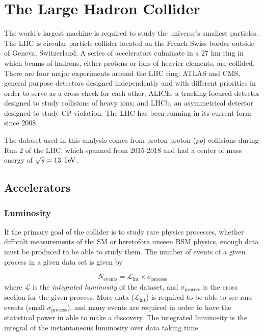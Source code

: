 \chapter{The Large Hadron Collider}

The world's largest machine is required to study the universe's smallest particles. The \ac{LHC} is circular particle collider located on the French-Swiss border outside of Geneva, Switzerland. A series of accelerators culminate in a $27$ km ring in which beams of hadrons, either protons or ions of heavier elements, are collided. There are four major experiments around the \ac{LHC} ring: \ac{ATLAS} and \ac{CMS}, general purpose detectors designed independently and with different priorities in order to serve as a cross-check for each other; \ac{ALICE}, a tracking-focused detector designed to study collisions of heavy ions; and \ac{LHCb}, an asymmetrical detector designed to study \ac{CP} violation. The \ac{LHC} has been running in its current form since 2008

The dataset used in this analysis comes from proton-proton ($pp$) collisions during Run 2 of the \ac{LHC}, which spanned from 2015-2018 and had a center of mass energy of $\sqrt{s} = 13 \TeV$.

\section{Accelerators}



\subsection{Luminosity}

If the primary goal of the collider is to study rare physics processes, whether difficult measurements of the \ac{SM} or heretofore unseen \ac{BSM} physics, enough data must be produced to be able to study them. The number of events of a given process in a given data set is given by

\begin{equation}
N_{\textrm{events}} = \mathcal{L}_{\textrm{int}} \times \sigma_{\textrm{process}}
\label{eq:nevents_lumi}
\end{equation}
where $\mathcal{L}$ is the \emph{integrated luminosity} of the dataset, and $\sigma_{\textrm{process}}$ is the cross section for the given process. More data ($\mathcal{L}_{\textrm{int}}$) is required to be able to see rare events (small $\sigma_{\textrm{process}}$), and many events are required in order to have the statistical power in able to make a discovery. The integrated luminosity is the integral of the instantaneous luminosity over data taking time

